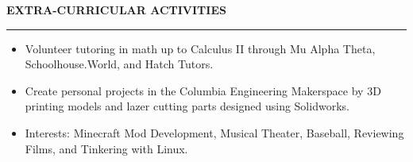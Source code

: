 \documentclass[10pt,letterpaper]{article}
\begin{document}
\medskip
\MakeUppercase{{\bf Extra-Curricular Activities}} %
\medskip
\hrule %
\begin{list}{}{\setlength{\leftmargin}{0em}}
\item
\begin{itemize}
    \item Volunteer tutoring in math up to Calculus II through Mu Alpha Theta, Schoolhouse.World, and Hatch Tutors.
    \item Create personal projects in the Columbia Engineering Makerspace by 3D printing models and lazer cutting parts designed using Solidworks.
    \item Interests: Minecraft Mod Development, Musical Theater, Baseball, Reviewing Films, and Tinkering with Linux.
\end{itemize}
\end{list}


\end{document}
